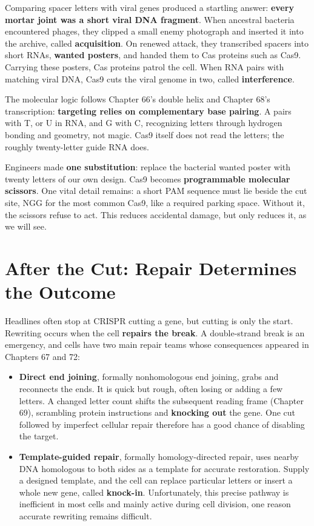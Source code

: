 Comparing spacer letters with viral genes produced a startling answer: \textbf{every mortar joint was a short viral DNA fragment}. When ancestral bacteria encountered phages, they clipped a small enemy photograph and inserted it into the archive, called \textbf{acquisition}. On renewed attack, they transcribed spacers into short RNAs, \textbf{wanted posters}, and handed them to Cas proteins such as Cas9. Carrying these posters, Cas proteins patrol the cell. When RNA pairs with matching viral DNA, Cas9 cuts the viral genome in two, called \textbf{interference}.

The molecular logic follows Chapter 66's double helix and Chapter 68's transcription: \textbf{targeting relies on complementary base pairing}. A pairs with T, or U in RNA, and G with C, recognizing letters through hydrogen bonding and geometry, not magic. Cas9 itself does not read the letters; the roughly twenty-letter guide RNA does.

Engineers made \textbf{one substitution}: replace the bacterial wanted poster with twenty letters of our own design. Cas9 becomes \textbf{programmable molecular scissors}. One vital detail remains: a short PAM sequence must lie beside the cut site, NGG for the most common Cas9, like a required parking space. Without it, the scissors refuse to act. This reduces accidental damage, but only reduces it, as we will see.

\section{After the Cut: Repair Determines the Outcome}

Headlines often stop at CRISPR cutting a gene, but cutting is only the start. Rewriting occurs when the cell \textbf{repairs the break}. A double-strand break is an emergency, and cells have two main repair teams whose consequences appeared in Chapters 67 and 72:

\begin{itemize}[itemsep=2pt]
\item \textbf{Direct end joining}, formally nonhomologous end joining, grabs and reconnects the ends. It is quick but rough, often losing or adding a few letters. A changed letter count shifts the subsequent reading frame (Chapter 69), scrambling protein instructions and \textbf{knocking out} the gene. One cut followed by imperfect cellular repair therefore has a good chance of disabling the target.
\item \textbf{Template-guided repair}, formally homology-directed repair, uses nearby DNA homologous to both sides as a template for accurate restoration. Supply a designed template, and the cell can replace particular letters or insert a whole new gene, called \textbf{knock-in}. Unfortunately, this precise pathway is inefficient in most cells and mainly active during cell division, one reason accurate rewriting remains difficult.
\end{itemize}

